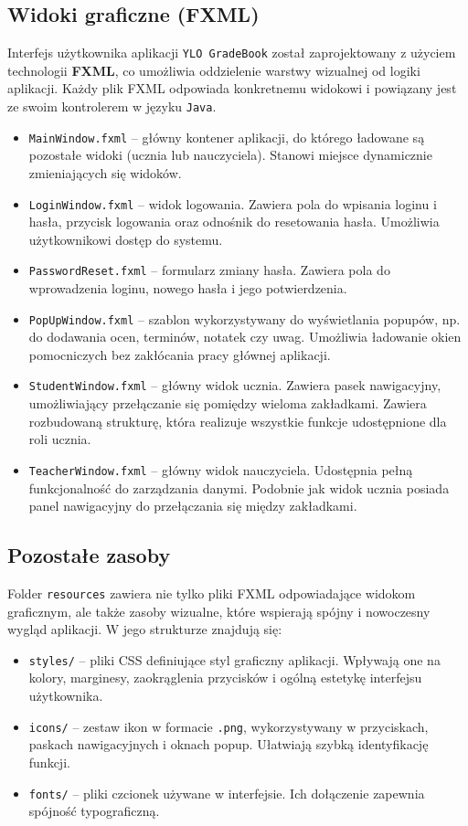 \subsection{Widoki graficzne (FXML)}
\label{sec:widokiFXML}

Interfejs użytkownika aplikacji \texttt{YLO GradeBook} został zaprojektowany z użyciem technologii \textbf{FXML}, co umożliwia oddzielenie warstwy wizualnej od logiki aplikacji. Każdy plik FXML odpowiada konkretnemu widokowi i powiązany jest ze swoim kontrolerem w języku \texttt{Java}.

\begin{itemize}
    \item \texttt{MainWindow.fxml} – główny kontener aplikacji, do którego ładowane są pozostałe widoki (ucznia lub nauczyciela). Stanowi miejsce dynamicznie zmieniających się widoków.
    \item \texttt{LoginWindow.fxml} – widok logowania. Zawiera pola do wpisania loginu i hasła, przycisk logowania oraz odnośnik do resetowania hasła. Umożliwia użytkownikowi dostęp do systemu.
    \item \texttt{PasswordReset.fxml} – formularz zmiany hasła. Zawiera pola do wprowadzenia loginu, nowego hasła i jego potwierdzenia.
    \item \texttt{PopUpWindow.fxml} – szablon wykorzystywany do wyświetlania popupów, np. do dodawania ocen, terminów, notatek czy uwag. Umożliwia ładowanie okien pomocniczych bez zakłócania pracy głównej aplikacji.
    \item \texttt{StudentWindow.fxml} – główny widok ucznia. Zawiera pasek nawigacyjny, umożliwiający przełączanie się pomiędzy wieloma zakładkami. Zawiera rozbudowaną strukturę, która realizuje wszystkie funkcje udostępnione dla roli ucznia.
    \item \texttt{TeacherWindow.fxml} – główny widok nauczyciela. Udostępnia pełną funkcjonalność do zarządzania danymi. Podobnie jak widok ucznia posiada panel nawigacyjny do przełączania się między zakładkami.
\end{itemize}

\subsection{Pozostałe zasoby}
Folder \texttt{resources} zawiera nie tylko pliki FXML odpowiadające widokom graficznym, ale także zasoby wizualne, które wspierają spójny i nowoczesny wygląd aplikacji. W jego strukturze znajdują się:
\begin{itemize}
    \item \texttt{styles/} – pliki CSS definiujące styl graficzny aplikacji. Wpływają one na kolory, marginesy, zaokrąglenia przycisków i ogólną estetykę interfejsu użytkownika.
    \item \texttt{icons/} – zestaw ikon w formacie \texttt{.png}, wykorzystywany w przyciskach, paskach nawigacyjnych i oknach popup. Ułatwiają szybką identyfikację funkcji.
    \item \texttt{fonts/} – pliki czcionek używane w interfejsie. Ich dołączenie zapewnia spójność typograficzną.
\end{itemize}

